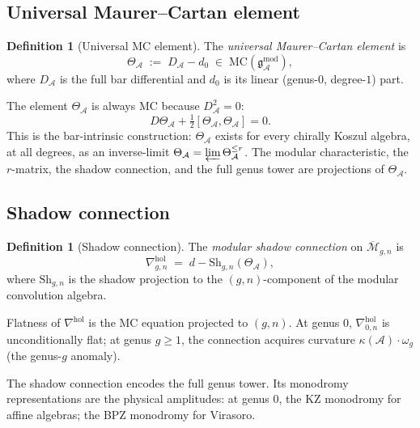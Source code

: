 \documentclass[11pt,reqno]{amsart}
\theoremstyle{definition}
\newtheorem{definition}[theorem]{Definition}
\theoremstyle{remark}
\newcommand{\cA}{\mathcal{A}}
\newcommand{\cM}{\mathcal{M}}
\newcommand{\MC}{\mathrm{MC}}
\newcommand{\Sh}{\mathrm{Sh}}
\newcommand{\hol}{\mathrm{hol}}
\newcommand{\gmod}{\mathfrak{g}^{\mathrm{mod}}_{\cA}}
\numberwithin{equation}{section}
\begin{document}
\subsection{Universal Maurer--Cartan element}\label{subsec:mc}

\begin{definition}[Universal MC element]\label{def:mc}
The \emph{universal Maurer--Cartan element} is
\begin{equation}\label{eq:mc}
\Theta_{\cA} \;:=\; D_{\cA} - d_0
\;\in\;
\MC(\gmod),
\end{equation}
where $D_{\cA}$ is the full bar differential and $d_0$ is its
linear (genus-$0$, degree-$1$) part.
\end{definition}

The element $\Theta_{\cA}$ is always MC because $D_{\cA}^2 = 0$:
\begin{equation}\label{eq:mc-eq}
D\Theta_{\cA} + \tfrac{1}{2}[\Theta_{\cA}, \Theta_{\cA}] = 0.
\end{equation}
This is the bar-intrinsic construction: $\Theta_{\cA}$ exists for
every chirally Koszul algebra, at all degrees, as an inverse-limit
$\Theta_{\cA} = \varprojlim \Theta_{\cA}^{\leq r}$. The modular
characteristic, the $r$-matrix, the shadow connection, and the full
genus tower are projections of $\Theta_{\cA}$.


\subsection{Shadow connection}\label{subsec:shadow-connection}

\begin{definition}[Shadow connection]\label{def:shadow-connection}
The \emph{modular shadow connection} on $\overline{\cM}_{g,n}$ is
\begin{equation}\label{eq:shadow-connection}
\nabla^{\hol}_{g,n}
\;=\;
d - \Sh_{g,n}(\Theta_{\cA}),
\end{equation}
where $\Sh_{g,n}$ is the shadow projection to the
$(g,n)$-component of the modular convolution algebra.
\end{definition}

Flatness of $\nabla^{\hol}$ is the MC equation projected to
$(g,n)$. At genus $0$, $\nabla^{\hol}_{0,n}$ is
unconditionally flat; at genus $g \geq 1$, the connection acquires
curvature $\kappa(\cA) \cdot \omega_g$ (the genus-$g$ anomaly).

The shadow connection encodes the full genus tower. Its
monodromy representations are the physical amplitudes: at genus $0$,
the KZ monodromy for affine algebras; the BPZ monodromy for
Virasoro.
\end{document}
